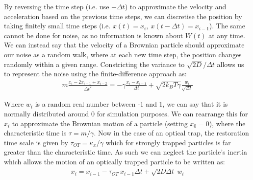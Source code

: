 By reversing the time step (i.e. use $-\Delta t$) to approximate 
the velocity and acceleration based on the previous time steps, 
we can discretise the position by taking finitely small  time 
steps (i.e. $x(t) = x_i,\ x(t-\Delta t) = x_{i-1}$). The same 
cannot be done for noise, as no information is known about $W(t)$ 
at any time. We can instead say that the velocity of a Brownian 
particle should approximate our noise as a random walk, where at 
each new time step, the position changes randomly within a given 
range. Constricting the variance to $\sqrt{2D}/\Delta t$ allows 
us to represent the noise using the finite-difference approach as:
\begin{align}
	m\frac{x_i-2x_{i-1}+x_{i-2}}{\Delta t^2} = -\gamma\frac{x_i-x_{i-1}}{\Delta t}+\sqrt{2k_BT\gamma}\frac{w_i}{\sqrt{\Delta t}}
\end{align}

Where $w_i$ is a random real number between -1 and 1, we can say 
that it is normally distributed around 0 for simulation purposes. 
We can rearrange this for $x_i$ to approximate the Brownian motion 
of a particle (setting $x_0=0$), where the characteristic time is 
$\tau = m/\gamma$. Now in the case of an optical trap, the 
restoration time scale is given by $\tau_{OT}=\kappa_x/\gamma$ 
which for strongly trapped particles is far greater than the 
characteristic time. As such we can neglect the particle's inertia 
which allows the motion of an optically trapped particle to be written 
as:
\begin{align}
	\label{eq:sim_langevin}
	x_i = x_{i-1} - \tau_{OT}\ x_{i-1}\Delta t + \sqrt{2D\Delta t}\ w_i
\end{align} 

